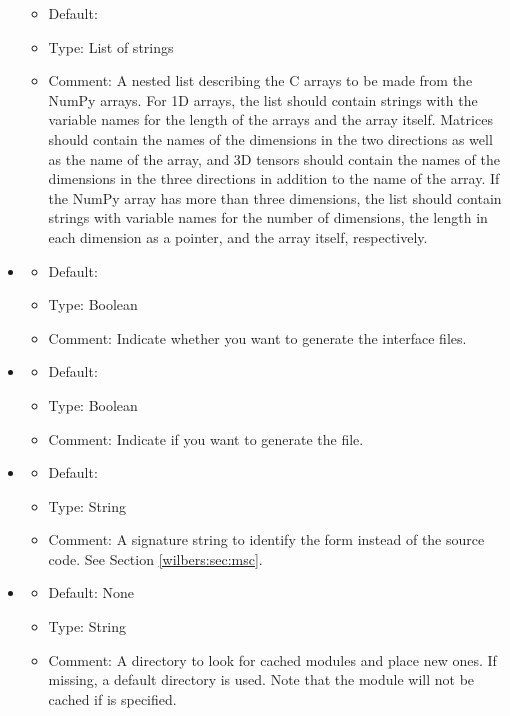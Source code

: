 \begin{itemize}
\begin{itemize}
    \item Default: \emp{[]}
    \item Type: List of strings
    \item Comment: A nested list describing the C arrays to be made from the NumPy arrays.
        For 1D arrays, the list should contain strings with the variable names for the length of
        the arrays and the array itself. Matrices should contain the names
        of the dimensions in the two directions as well as the name of the
        array, and 3D tensors should contain the names of the dimensions in
        the three directions in addition to the name of the array.
        If the NumPy array has more than three dimensions, the list should
        contain strings with variable names for the number of dimensions,
        the length in each dimension as a pointer, and the array itself,
        respectively.
  \end{itemize}
\item {}
  \begin{itemize}
    \item Default: 
    \item Type: Boolean
    \item Comment: Indicate whether you want to generate the interface files.
  \end{itemize}
\item {}
  \begin{itemize}
    \item Default: 
    \item Type: Boolean
    \item Comment: Indicate if you want to generate the  file.
  \end{itemize}
\item {}
  \begin{itemize}
    \item Default: 
    \item Type: String
    \item Comment: A signature string to identify the form instead of the
      source code. See Section \ref{wilbers:sec:msc}.
  \end{itemize}
\item {}
  \begin{itemize}
    \item Default: None
    \item Type: String
    \item Comment: A directory to look for cached modules and place new ones.
      If missing, a default directory is used. Note that the module
      will not be cached if  is specified.
  \end{itemize}
\end{itemize}

